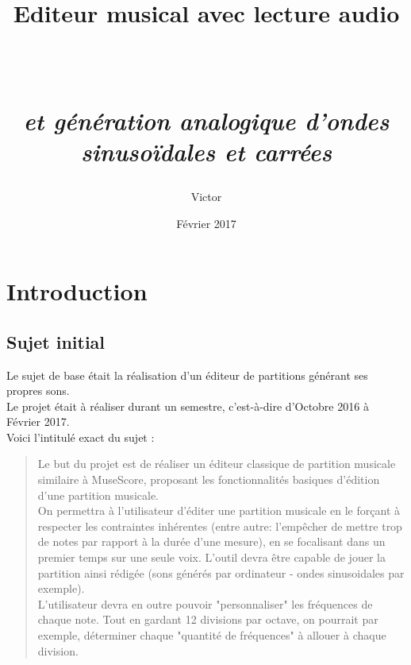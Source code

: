 \documentclass[12pt]{report}
\begin{document}
\title{\begin{Huge}Editeur musical avec lecture audio\end{Huge} \\
    \begin{normalsize}\textit{et génération analogique d'ondes sinusoïdales et carrées}\end{normalsize}
    }
\author{Victor }
\date{Février 2017}
 
\maketitle
{}
\tableofcontents

\chapter{Introduction}
\section{Sujet initial}
Le sujet de base était la réalisation d'un éditeur de partitions générant ses propres sons.\\
Le projet était à réaliser durant un semestre, c'est-à-dire d'Octobre 2016 à Février 2017. \\
Voici l'intitulé exact du sujet :\\
\begin{mdframed}[backgroundcolor=grey]
 


\begin{quotation}
Le but du projet est de réaliser un éditeur classique de partition
musicale similaire à MuseScore, proposant les
fonctionnalités basiques d'édition d'une partition musicale.\\
On permettra à l'utilisateur d'éditer une partition musicale en le
forçant à respecter les contraintes inhérentes (entre autre: l'empêcher
de mettre trop de notes par rapport à la durée d'une mesure), en se
focalisant dans un premier temps sur une seule voix. L'outil devra être
capable de jouer la partition ainsi rédigée (sons générés par ordinateur
- ondes sinusoidales par exemple).\\
L'utilisateur devra en outre pouvoir "personnaliser" les fréquences de
chaque note. Tout en gardant 12 divisions par octave, on pourrait par
exemple, déterminer chaque "quantité de fréquences" à allouer à chaque
division.
\end{quotation}


\end{mdframed}
\vskip 0.3in
\end{document}
